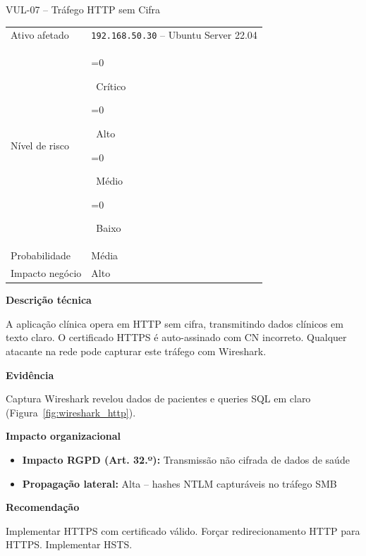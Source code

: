 \documentclass[12pt, a4paper]{report}
\newcommand{\risk}[1]{%
  \ifnum\pdfstrcmp{#1}{Critico}=0{\colorbox{Critical}{\color{white}\bfseries\footnotesize\strut~Crítico~}}\fi
  \ifnum\pdfstrcmp{#1}{Alto}=0{\colorbox{High}{\color{white}\bfseries\footnotesize\strut~Alto~}}\fi
  \ifnum\pdfstrcmp{#1}{Medio}=0{\colorbox{Medium}{\color{black}\bfseries\footnotesize\strut~Médio~}}\fi
  \ifnum\pdfstrcmp{#1}{Baixo}=0{\colorbox{Low}{\color{white}\bfseries\footnotesize\strut~Baixo~}}\fi}
\begin{document}
\begin{finding}{VUL-07 -- Tráfego HTTP sem Cifra}
\begin{tabular}{@{}ll@{}}
  \small\color{TextGray}Ativo afetado   & \texttt{192.168.50.30} -- Ubuntu Server 22.04 \\[3pt]
  \small\color{TextGray}Nível de risco  & \risk{Alto} \\[3pt]
  \small\color{TextGray}Probabilidade   & Média \\[3pt]
  \small\color{TextGray}Impacto negócio & Alto \\
\end{tabular}

\vspace{8pt}\textbf{Descrição técnica}

A aplicação clínica opera em HTTP sem cifra, transmitindo dados clínicos em texto claro. O
certificado HTTPS é auto-assinado com CN incorreto. Qualquer atacante na rede pode capturar
este tráfego com Wireshark.

\vspace{6pt}\textbf{Evidência}

Captura Wireshark revelou dados de pacientes e queries SQL em claro (Figura~\ref{fig:wireshark_http}).

\vspace{4pt}\textbf{Impacto organizacional}
\begin{itemize}[itemsep=1pt]
  \item \textbf{Impacto RGPD (Art. 32.º):} Transmissão não cifrada de dados de saúde
  \item \textbf{Propagação lateral:} Alta -- hashes NTLM capturáveis no tráfego SMB
\end{itemize}

\vspace{4pt}\textbf{Recomendação}

Implementar HTTPS com certificado válido. Forçar redirecionamento HTTP para HTTPS. Implementar HSTS.
\end{finding}

\vspace{0.8em}
\end{document}
